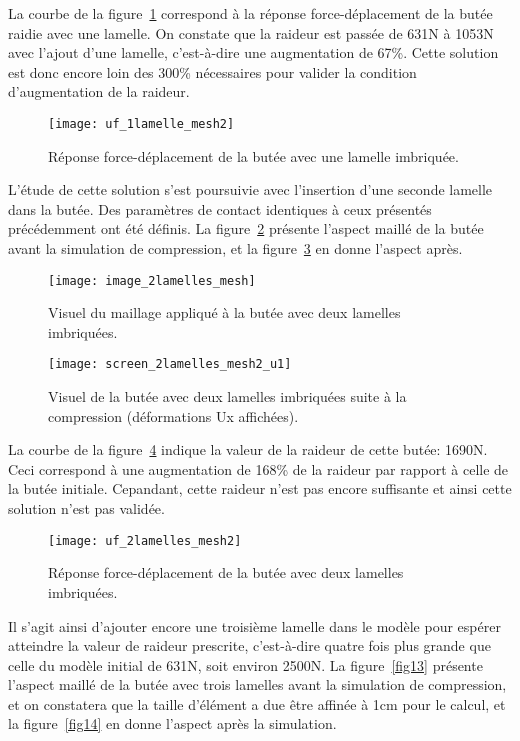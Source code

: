 ﻿ \documentclass{article}
\begin{document}
La courbe de la figure~\ref{fig9} correspond à la réponse force-déplacement de la butée raidie avec une lamelle. On constate que la raideur est passée de 631N à 1053N avec l'ajout d'une lamelle, c'est-à-dire une augmentation de 67\%. Cette solution est donc encore loin des 300\% nécessaires pour valider la condition d'augmentation de la raideur.

\begin{figure}[!h]
	\centering
	\texttt{[image: uf\_1lamelle\_mesh2]}
	\caption{Réponse force-déplacement de la butée avec une lamelle imbriquée.}
	\label{fig9}
\end{figure}

L'étude de cette solution s'est poursuivie avec l'insertion d'une seconde lamelle dans la butée. Des paramètres de contact identiques à ceux présentés précédemment ont été définis. La figure~\ref{fig10} présente l'aspect maillé de la butée avant la simulation de compression, et la figure~\ref{fig11} en donne l'aspect après.

\begin{figure}[!h]
	\centering
	\texttt{[image: image\_2lamelles\_mesh]}
	\caption{Visuel du maillage appliqué à la butée avec deux lamelles imbriquées.}
	\label{fig10}
\end{figure}

\begin{figure}[!h]
	\centering
	\texttt{[image: screen\_2lamelles\_mesh2\_u1]}
	\caption{Visuel de la butée avec deux lamelles imbriquées suite à la compression (déformations Ux affichées).}
	\label{fig11}
\end{figure}

La courbe de la figure~\ref{fig12} indique la valeur de la raideur de cette butée: 1690N. Ceci correspond à une augmentation de 168\% de la raideur par rapport à celle de la butée initiale. Cepandant, cette raideur n'est pas encore suffisante et ainsi cette solution n'est pas validée.
 
\begin{figure}[!h]
	\centering
	\texttt{[image: uf\_2lamelles\_mesh2]}
	\caption{Réponse force-déplacement de la butée avec deux lamelles imbriquées.}
	\label{fig12}
\end{figure}

Il s'agit ainsi d'ajouter encore une troisième lamelle dans le modèle pour espérer atteindre la valeur de raideur prescrite, c'est-à-dire quatre fois plus grande que celle du modèle initial de 631N, soit environ 2500N. La figure~\ref{fig13} présente l'aspect maillé de la butée avec trois lamelles avant la simulation de compression, et on constatera que la taille d'élément a due être affinée à 1cm pour le calcul, et la figure~\ref{fig14} en donne l'aspect après la simulation.
\end{document}

